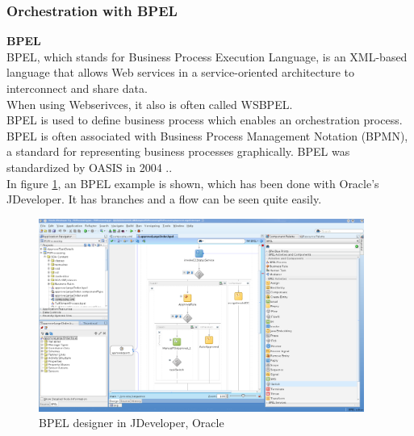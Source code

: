 \documentclass[12pt]{article}
\begin{document}
\subsubsection{Orchestration with BPEL}
\label{sec:bpel}
\textbf{BPEL} \\ 
BPEL, which stands for Business Process Execution Language, is an XML-based language that allows Web services in a service-oriented architecture to interconnect and share data.\\ When using Webserivces, it also is often called WSBPEL.\\ BPEL is used to define business process which enables an orchestration process. 
BPEL is often associated with Business Process Management Notation (BPMN), a standard for representing business processes graphically. BPEL was standardized by OASIS in 2004 .\cite{bpelsearchsoa}.\\
In figure \ref{fig:BPELdesigner}, an BPEL example is shown, which has been done with Oracle's JDeveloper. It has branches and a flow can be seen quite easily. 
\\
\begin{figure}[here!]
	\centering
	\includegraphics[width=0.95\textwidth]{images/screenshot2}
	\caption{BPEL designer in JDeveloper, Oracle \cite{bpelsc}}
	\label{fig:BPELdesigner}
	\end{figure}
	\FloatBarrier \noindent
\end{document}
